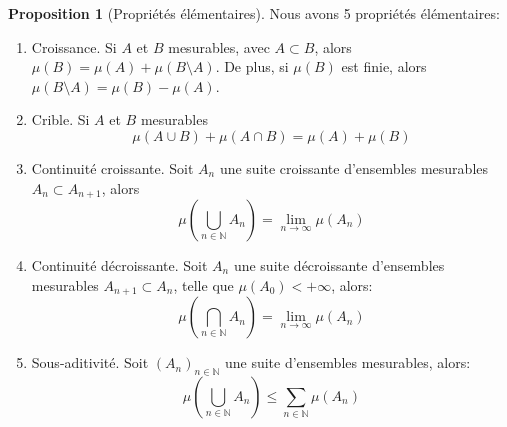 \documentclass{article}
\theoremstyle{definition}
\theoremstyle{definition}
\newtheorem{prop}{Proposition}
\theoremstyle{definition}
\theoremstyle{definition}
\theoremstyle{plain}
\theoremstyle{definition}
\begin{document}
\begin{prop}[Propriétés élémentaires]\label{prop:mesure:elementaire}
	Nous avons 5 propriétés élémentaires:
	\begin{enumerate}
		\item Croissance. Si $A$ et $B$ mesurables, avec $A \subset B$, alors $\mu(B) = \mu(A) + \mu(B \setminus A)$. De plus,
		      si $\mu(B)$ est finie, alors $\mu(B\setminus A) = \mu(B) - \mu(A)$.
		\item Crible. Si $A$ et $B$ mesurables
		      \[\mu(A\cup B) + \mu(A \cap B) = \mu(A) + \mu(B)\]
		\item Continuité croissante. Soit $A_n$ une suite croissante d'ensembles mesurables $A_n \subset A_{n+1}$,
		      alors
		      \[\mu(\bigcup\limits_{n \in \mathbb{N}} A_n) = \lim\limits_{n \to \infty} \mu(A_n)\]
		\item Continuité décroissante. Soit $A_n$ une suite décroissante d'ensembles mesurables $A_{n+1}
			      \subset A_n$, telle que $\mu(A_0) < +\infty$, alors:
		      \[\mu(\bigcap\limits_{n \in \mathbb{N}} A_n) = \lim\limits_{n \to \infty} \mu(A_n)\]
		\item Sous-aditivité. Soit $(A_n)_{n \in \mathbb{N}}$ une suite d'ensembles mesurables, alors:
		      \[\mu(\bigcup\limits_{n \in \mathbb{N}} A_n) \leq \sum\limits_{n \in \mathbb{N}} \mu(A_n)\]
	\end{enumerate}
\end{prop}
\end{document}
